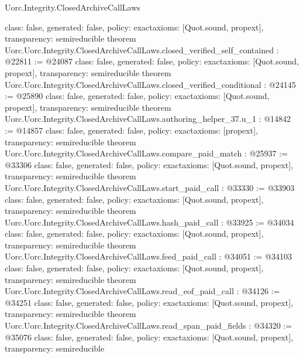 \begin{lexlean}{Uorc.Integrity.ClosedArchiveCallLaws}
\begin{coremodule}
{  class: false,
  generated: false,
  policy: exact{axioms: [Quot.sound, propext]},
  transparency: semireducible
}
theorem Uorc.Uorc.Integrity.ClosedArchiveCallLaws.closed_verified_self_contained : @22811 := @24087 {
  class: false,
  generated: false,
  policy: exact{axioms: [Quot.sound, propext]},
  transparency: semireducible
}
theorem Uorc.Uorc.Integrity.ClosedArchiveCallLaws.closed_verified_conditional : @24145 := @25890 {
  class: false,
  generated: false,
  policy: exact{axioms: [Quot.sound, propext]},
  transparency: semireducible
}
theorem Uorc.Uorc.Integrity.ClosedArchiveCallLaws.authoring_helper_37.{u_1} : @14842 := @14857 {
  class: false,
  generated: false,
  policy: exact{axioms: [propext]},
  transparency: semireducible
}
theorem Uorc.Uorc.Integrity.ClosedArchiveCallLaws.compare_paid_match : @25937 := @33306 {
  class: false,
  generated: false,
  policy: exact{axioms: [Quot.sound, propext]},
  transparency: semireducible
}
theorem Uorc.Uorc.Integrity.ClosedArchiveCallLaws.start_paid_call : @33330 := @33903 {
  class: false,
  generated: false,
  policy: exact{axioms: [Quot.sound, propext]},
  transparency: semireducible
}
theorem Uorc.Uorc.Integrity.ClosedArchiveCallLaws.hash_paid_call : @33925 := @34034 {
  class: false,
  generated: false,
  policy: exact{axioms: [Quot.sound, propext]},
  transparency: semireducible
}
theorem Uorc.Uorc.Integrity.ClosedArchiveCallLaws.feed_paid_call : @34051 := @34103 {
  class: false,
  generated: false,
  policy: exact{axioms: [Quot.sound, propext]},
  transparency: semireducible
}
theorem Uorc.Uorc.Integrity.ClosedArchiveCallLaws.read_eof_paid_call : @34126 := @34251 {
  class: false,
  generated: false,
  policy: exact{axioms: [Quot.sound, propext]},
  transparency: semireducible
}
theorem Uorc.Uorc.Integrity.ClosedArchiveCallLaws.read_span_paid_fields : @34320 := @35076 {
  class: false,
  generated: false,
  policy: exact{axioms: [Quot.sound, propext]},
  transparency: semireducible
}


\end{coremodule}
\end{lexlean}
